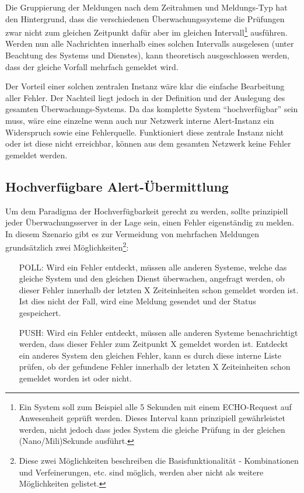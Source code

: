 Die Gruppierung der Meldungen nach dem Zeitrahmen und Meldungs-Typ hat den Hintergrund, dass die verschiedenen \"Uberwachungssysteme die Pr\"ufungen zwar nicht zum gleichen Zeitpunkt daf\"ur aber im gleichen Intervall\footnote{Ein System soll zum Beispiel alle 5 Sekunden mit einem ECHO-Request auf Anwesenheit gepr\"uft werden. Dieses Interval kann prinzipiell gew\"ahrleistet werden, nicht jedoch dass jedes System die gleiche Pr\"ufung in der gleichen (Nano/Mili)Sekunde ausf\"uhrt.} ausf\"uhren. Werden nun alle Nachrichten innerhalb eines solchen Intervalls ausgelesen (unter Beachtung des Systems und Dienstes), kann theoretisch ausgeschlossen werden, dass der gleiche Vorfall mehrfach gemeldet wird.

Der Vorteil einer solchen zentralen Instanz w\"are klar die einfache Bearbeitung aller Fehler. Der Nachteil liegt jedoch in der Definition und der Auslegung des gesamten \"Uberwachungs-Systems. Da das komplette System "`hochverf\"ugbar"' sein muss, w\"are eine einzelne wenn auch nur Netzwerk interne Alert-Instanz ein Widerspruch sowie eine Fehlerquelle. Funktioniert diese zentrale Instanz nicht oder ist diese nicht erreichbar, k\"onnen aus dem gesamten Netzwerk keine Fehler gemeldet werden.

\subsection{Hochverf\"ugbare Alert-\"Ubermittlung} \label{sec:theorie-alert-ha}
Um dem Paradigma der Hochverf\"ugbarkeit gerecht zu werden, sollte prinzipiell jeder \"Uberwachungsserver in der Lage sein, einen Fehler eigenst\"andig zu melden. In diesem Szenario gibt es zur Vermeidung von mehrfachen Meldungen grunds\"atzlich zwei M\"oglichkeiten\footnote{Diese zwei M\"oglichkeiten beschreiben die Basisfunktionalit\"at - Kombinationen und Verfeinerungen, etc. sind m\"oglich, werden aber nicht als weitere M\"oglichkeiten gelistet.}:

\begin{itemize}
 \item[POLL:] Wird ein Fehler entdeckt, m\"ussen alle anderen Systeme, welche das gleiche System und den gleichen Dienst \"uberwachen, angefragt werden, ob dieser Fehler innerhalb der letzten X Zeiteinheiten schon gemeldet worden ist. Ist dies nicht der Fall, wird eine Meldung gesendet und der Status gespeichert.
 \item[PUSH:] Wird ein Fehler entdeckt, m\"ussen alle anderen Systeme benachrichtigt werden, dass dieser Fehler zum Zeitpunkt X gemeldet worden ist. Entdeckt ein anderes System den gleichen Fehler, kann es durch diese interne Liste pr\"ufen, ob der gefundene Fehler innerhalb der letzten X Zeiteinheiten schon gemeldet worden ist oder nicht.
\end{itemize}

